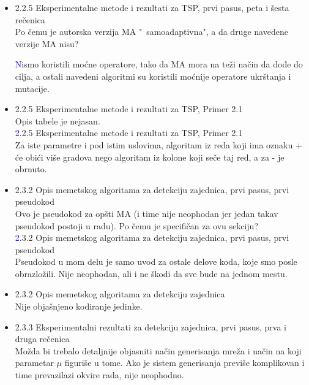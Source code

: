 \documentclass[a4paper]{report}
\newcommand{\odgovor}[1]{\textcolor{blue}{#1}}
\begin{document}
\begin{itemize}
    
    \item 2.2.5 Eksperimentalne metode i rezultati za TSP, prvi pasus, peta i šesta rečenica \\
    Po čemu je autorska verzija MA "\ samoadaptivna", a da druge navedene verzije MA nisu?
    
    \odgovor
    Nismo koristili moćne operatore, tako da MA mora na teži način da dođe do cilja, a ostali navedeni algoritmi su koristili moćnije operatore ukrštanja i mutacije. 
    
    \item 2.2.5 Eksperimentalne metode i rezultati za TSP, Primer 2.1 \\
    Opis tabele je nejasan.\\
       \odgovor 2.2.5 Eksperimentalne metode i rezultati za TSP, Primer 2.1\\
       Za iste parametre i pod istim uslovima,  algoritam iz reda koji ima oznaku + će obići više gradova nego algoritam iz kolone koji seče taj red, a za - je obrnuto. 
    
    
    \item 2.3.2 Opis memetskog algoritama za detekciju zajednica, prvi pasus, prvi pseudokod \\
    Ovo je pseudokod za opšti MA (i time nije neophodan jer jedan takav pseudokod postoji u radu). Po čemu je specifičan za ovu sekciju?\\
     \odgovor 2.3.2 Opis memetskog algoritama za detekciju zajednica, prvi pasus, prvi pseudokod \\
     Pseudokod u mom delu je samo uvod za ostale delove koda, koje smo posle obrazložili. Nije neophodan, ali i ne škodi da sve bude na jednom mestu.
    
    \item 2.3.2 Opis memetskog algoritama za detekciju zajednica \\
    Nije objašnjeno kodiranje jedinke.
    \item 2.3.3 Eksperimentalni rezultati za detekciju zajednica, prvi pasus, prva i druga rečenica \\
    Možda bi trebalo detaljnije objasniti način generisanja mreža i način na koji parametar $\mu$ figuriše u tome. Ako je sistem generisanja previše komplikovan i time prevazilazi okvire rada, nije neophodno.
\end{itemize}
\end{document}
